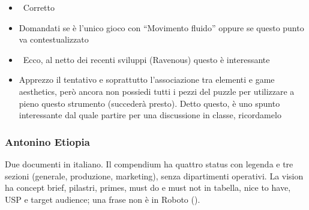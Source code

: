 {\begin{itemize}
\begin{itemize}
          \item Effetti come lo shake della camera rientrano nel juice e sono proprio necessari, come discutibilmente sui feedback del combat
          \item Per i NtH, pensa a sistemi accessori del gioco: Dread funzionerebbe senza il sistema di ``puntine'' per segnalare punti in mappa? E senza gli extra sbloccabili? E senza modalità alternative?
        \end{itemize}
  \item {} \rvBene\ Corretto
  \item {} Domandati se è l'unico gioco con ``Movimento fluido'' oppure se questo punto va contestualizzato
  \item {} \rvBene\ Ecco, al netto dei recenti sviluppi (Ravenous) questo è interessante
  \item {} Apprezzo il tentativo e soprattutto l'associazione tra elementi e game aesthetics, però ancora non possiedi tutti i pezzi del puzzle per utilizzare a pieno questo strumento (succederà presto). Detto questo, è uno spunto interessante dal quale partire per una discussione in classe, ricordamelo
\end{itemize}
}

\subsubsection{Antonino Etiopia}
Due documenti in italiano. Il compendium ha quattro status con legenda e tre sezioni (generale, produzione, marketing), senza dipartimenti operativi. La vision ha concept brief, pilastri, primes, must do e must not in tabella, nice to have, USP e target audience; una frase non è in Roboto (\rvAvviso).
